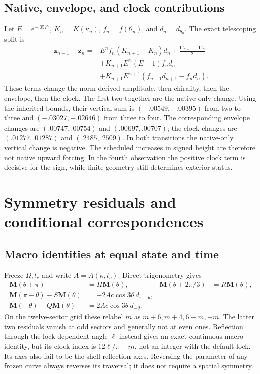 \documentclass[11pt,a4paper]{article}
\numberwithin{equation}{section}
\newcommand{\e}{\mathrm e}
\newcommand{\zobs}{\mathbf z}
\newcommand{\macro}{\mathbf M}
\newcommand{\chiral}{\mathbf C}
\begin{document}
\subsection{Native, envelope, and clock contributions}\label{sec:attribution}
Let $E=\e^{-.0577}$, $K_n=K(\kappa_n)$, $f_n=f(\theta_n)$, and
$d_n=d_{\theta_n}$. The exact telescoping split is
\begin{equation}\label{eq:attribution}
\begin{aligned}
\zobs_{n+1}-\zobs_n
={}&E^nf_n(K_{n+1}-K_n)d_n
+\frac{\chiral_{n+1}-\chiral_n}{2}\\
&+K_{n+1}E^n(E-1)f_nd_n\\
&+K_{n+1}E^{n+1}(f_{n+1}d_{n+1}-f_nd_n).
\end{aligned}
\end{equation}
These terms change the norm-derived amplitude, then chirality, then the
envelope, then the clock. The first two together are the native-only change.
Using the inherited bounds, their vertical sum is
$(-.00549,-.00395)$ from two to three and $(-.03027,-.02646)$ from three
to four. The corresponding envelope changes are $(.00747,.00754)$ and
$(.00697,.00707)$; the clock changes are $(.01277,.01287)$ and
$(.2485,.2509)$. In both transitions the native-only vertical change is
negative. The scheduled increases in signed height are therefore not native
upward forcing. In the fourth observation the positive clock term is decisive
for the sign, while finite geometry still determines exterior status.

\section{Symmetry residuals and conditional correspondences}\label{sec:zsymmetry}
\subsection{Macro identities at equal state and time}
Freeze $\Omega,t_c$ and write $A=A(\kappa,t_c)$. Direct trigonometry gives
\begin{equation}\label{eq:macroactions}
\begin{aligned}
\macro(\theta+\pi)&=H\macro(\theta),&
\macro(\theta+2\pi/3)&=R\macro(\theta),\\
\macro(\pi-\theta)-S\macro(\theta)
&=-2Ac\cos3\theta\,d_{\pi-\theta},\\
\macro(-\theta)-Q\macro(\theta)
&=2Ac\cos3\theta\,d_{-\theta}.
\end{aligned}
\end{equation}
On the twelve-sector grid these relabel $m$ as $m+6,m+4,6-m,-m$.
The latter two residuals vanish at odd sectors and generally not at even
ones. Reflection through the lock-dependent angle $\ell$ instead gives an
exact continuous macro identity, but its clock index is
$12\ell/\pi-m$, not an integer with the default lock. Its axes also fail to
be the shell reflection axes. Reversing the parameter of any frozen curve
always reverses its traversal; it does not require a spatial symmetry.
\end{document}

